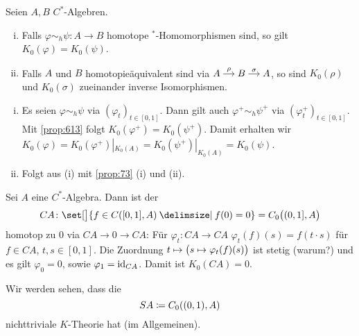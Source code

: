 \begin{proposition}
	Seien $A,B$ $C^*$-Algebren.
	\begin{enumerate}[(i)]
		\item Falls $\varphi \sim_h \psi \colon A \to B$ homotope $^*$-Homomorphismen sind, so gilt $K_0(\varphi) = K_0(\psi)$.
		\item Falls $A$ und $B$ homotopieäquivalent sind via \(
			\begin{tikzcd}[cramped,sep=small]
				A \rar["\rho"] & B \rar["\sigma"] & A
			\end{tikzcd}
		\), so sind $K_0(\rho)$ und $K_0(\sigma)$ zueinander inverse Isomorphismen.
	\end{enumerate}
\end{proposition}
\begin{beweis}
	\begin{enumerate}[(i)]
		\item Es seien $\varphi \sim_h \psi$ via $(\varphi_t)_{t \in [0,1]}$.
		Dann gilt auch $\varphi^+ \sim_h \psi^+$ via $(\varphi^+_t)_{t \in [0,1]}$.
		Mit \autoref{prop:613} folgt $K_0(\varphi^+) = K_0(\psi^+)$.
		Damit erhalten wir $K_0(\varphi) = K_0(\varphi^+)|_{K_0(A)} = K_0(\psi^+)|_{K_0(A)} = K_0(\psi)$.
		\item Folgt aus (i) mit \autoref{prop:73} (i) und (ii).\qedhere
	\end{enumerate}
\end{beweis}

\begin{beispiel}
	Sei $A$ eine $C^*$-Algebra.
	Dann ist der  
	\[
		CA \colon \set[\big]{f \in C([0,1],A) \given  f(0)=0} = C_0 \enbrace[\big]{(0,1],A}
	\]
	homotop zu $0$ via $CA \to 0 \to CA$:
	Für $\varphi_t \colon CA \to CA$ $\varphi_t(f)(s) = f(t \cdot s)$ für $f \in CA$, $t,s \in [0,1]$.
	Die Zuordnung $t \mapsto  \enbrace[\big]{s \mapsto \varphi_t(f)(s)}$ ist stetig (warum?) und es gilt $\varphi_0=0$, sowie $\varphi_1 = \id_{CA}$.
	Damit ist $K_0(CA) =0$.
	
	Wir werden sehen, dass die  
	\[
		SA \coloneqq C_0 \enbrace*{(0,1),A}
	\]
	nichttriviale $K$-Theorie hat (im Allgemeinen).
\end{beispiel}

